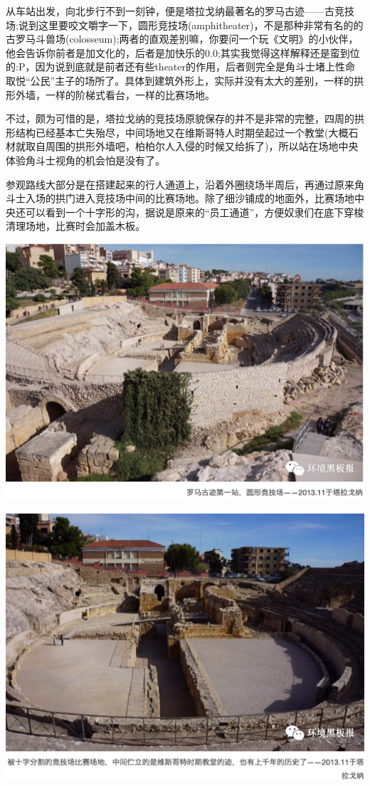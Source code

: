 \documentclass[
]{book}
\begin{document}
从车站出发，向北步行不到一刻钟，便是塔拉戈纳最著名的罗马古迹------古竞技场;说到这里要咬文嚼字一下，圆形竞技场(amphitheater)，不是那种非常有名的的古罗马斗兽场(colosseum);两者的直观差别嘛，你要问一个玩《文明》的小伙伴，他会告诉你前者是加文化的，后者是加快乐的0.0;其实我觉得这样解释还是蛮到位的:P，因为说到底就是前者还有些theater的作用，后者则完全是角斗士堵上性命取悦``公民''主子的场所了。具体到建筑外形上，实际并没有太大的差别，一样的拱形外墙，一样的阶梯式看台，一样的比赛场地。

不过，颇为可惜的是，塔拉戈纳的竞技场原貌保存的并不是非常的完整，四周的拱形结构已经基本亡失殆尽，中间场地又在维斯哥特人时期垒起过一个教堂(大概石材就取自周围的拱形外墙吧，柏柏尔人入侵的时候又给拆了)，所以站在场地中央体验角斗士视角的机会怕是没有了。

参观路线大部分是在搭建起来的行人通道上，沿着外圈绕场半周后，再通过原来角斗士入场的拱门进入竞技场中间的比赛场地。除了细沙铺成的地面外，比赛场地中央还可以看到一个十字形的沟，据说是原来的``员工通道''，方便奴隶们在底下穿梭清理场地，比赛时会加盖木板。

\includegraphics[width=8.33in]{images/xt28}

\includegraphics[width=8.33in]{images/xt29}
\end{document}
